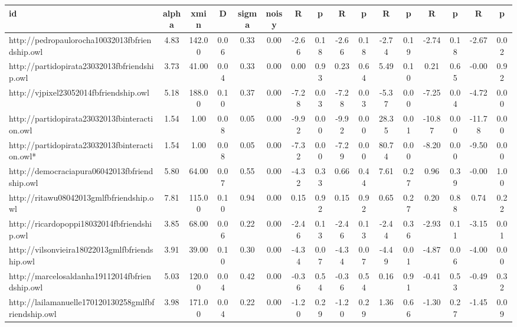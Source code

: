 \begin{table*}[h!]
\begin{center}
\begin{tabular}{| l | c | c | c | c | c | c | c | c | c | c | c | c | c | c | c |}\hline
id & alpha & xmin & D & sigma & noisy & R & p & R & p & R & p & R & p & R & p \\\hline
http://pedropaulorocha10032013fbfriendship.owl & 4.83  & 142.00  & 0.06  & 0.33  & 0.00  & -2.66  & 0.18  & -2.66  & 0.18  & -2.74  & 0.19  & -2.74  & 0.18  & -2.67  & 0.02 \\\hline
http://partidopirata23032013fbfriendship.owl & 3.73  & 41.00  & 0.04  & 0.33  & 0.00  & 0.00  & 0.93  & 0.23  & 0.64  & 5.49  & 0.10  & 0.21  & 0.65  & -0.00  & 0.92 \\\hline
http://vjpixel23052014fbfriendship.owl & 5.18  & 188.00  & 0.10  & 0.37  & 0.00  & -7.28  & 0.03  & -7.28  & 0.03  & -5.37  & 0.00  & -7.25  & 0.04  & -4.72  & 0.00 \\\hline
http://partidopirata23032013fbinteraction.owl & 1.54  & 1.00  & 0.08  & 0.05  & 0.00  & -9.92  & 0.00  & -9.92  & 0.00  & 28.35  & 0.01  & -10.87  & 0.00  & -11.78  & 0.00 \\\hline
http://partidopirata23032013fbinteraction.owl* & 1.54  & 1.00  & 0.08  & 0.05  & 0.00  & -7.32  & 0.00  & -7.29  & 0.00  & 80.74  & 0.00  & -8.20  & 0.00  & -9.50  & 0.00 \\\hline
http://democraciapura06042013fbfriendship.owl & 5.80  & 64.00  & 0.07  & 0.55  & 0.00  & -4.32  & 0.33  & 0.66  & 0.44  & 7.61  & 0.27  & 0.96  & 0.39  & -0.00  & 1.00 \\\hline
http://ritawu08042013gmlfbfriendship.owl & 7.81  & 115.00  & 0.10  & 0.94  & 0.00  & 0.15  & 0.92  & 0.15  & 0.92  & 0.65  & 0.27  & 0.20  & 0.88  & 0.74  & 0.22 \\\hline
http://ricardopoppi18032014fbfriendship.owl & 3.85  & 68.00  & 0.06  & 0.22  & 0.00  & -2.46  & 0.13  & -2.46  & 0.13  & -2.44  & 0.36  & -2.93  & 0.11  & -3.15  & 0.01 \\\hline
http://vilsonvieira18022013gmlfbfriendship.owl & 3.91  & 39.00  & 0.10  & 0.30  & 0.00  & -4.34  & 0.07  & -4.34  & 0.07  & -4.49  & 0.01  & -4.87  & 0.06  & -4.00  & 0.00 \\\hline
http://marcelosaldanha19112014fbfriendship.owl & 5.03  & 120.00  & 0.04  & 0.42  & 0.00  & -0.36  & 0.54  & -0.36  & 0.54  & 0.16  & 0.91  & -0.41  & 0.53  & -0.49  & 0.32 \\\hline
http://lailamanuelle170120130258gmlfbfriendship.owl & 3.98  & 171.00  & 0.04  & 0.22  & 0.00  & -1.20  & 0.29  & -1.20  & 0.29  & 1.36  & 0.66  & -1.30  & 0.27  & -1.45  & 0.09 \\\hline

\end{tabular}
\end{center}
\end{table*}
